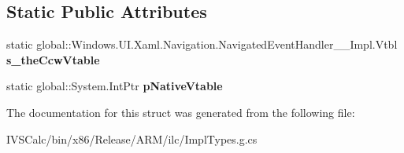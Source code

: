 \subsection*{Static Public Attributes}
\begin{DoxyCompactItemize}
\item 
\mbox{\label{struct_windows_1_1_u_i_1_1_xaml_1_1_navigation_1_1_navigated_event_handler_____impl_1_1_vtbl_ac11fd7594c3c8d1c822cbd7da5bcd6bc}} 
static global\+::\+Windows.\+U\+I.\+Xaml.\+Navigation.\+Navigated\+Event\+Handler\+\_\+\+\_\+\+Impl.\+Vtbl {\bfseries s\+\_\+the\+Ccw\+Vtable}
\item 
\mbox{\label{struct_windows_1_1_u_i_1_1_xaml_1_1_navigation_1_1_navigated_event_handler_____impl_1_1_vtbl_a69c6dd2f79bea9fc211a043a757d7d22}} 
static global\+::\+System.\+Int\+Ptr {\bfseries p\+Native\+Vtable}
\end{DoxyCompactItemize}


The documentation for this struct was generated from the following file\+:\begin{DoxyCompactItemize}
\item 
I\+V\+S\+Calc/bin/x86/\+Release/\+A\+R\+M/ilc/Impl\+Types.\+g.\+cs\end{DoxyCompactItemize}
